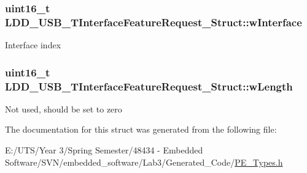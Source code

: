\subsubsection[{w\+Interface}]{\setlength{\rightskip}{0pt plus 5cm}uint16\+\_\+t L\+D\+D\+\_\+\+U\+S\+B\+\_\+\+T\+Interface\+Feature\+Request\+\_\+\+Struct\+::w\+Interface}\label{struct_l_d_d___u_s_b___t_interface_feature_request___struct_afc1da433b4a02f8c6a6ed6ce8b3065da}
Interface index \hypertarget{struct_l_d_d___u_s_b___t_interface_feature_request___struct_a5f54f1e83024342d9d63aad374a117ba}{}
\subsubsection[{w\+Length}]{\setlength{\rightskip}{0pt plus 5cm}uint16\+\_\+t L\+D\+D\+\_\+\+U\+S\+B\+\_\+\+T\+Interface\+Feature\+Request\+\_\+\+Struct\+::w\+Length}\label{struct_l_d_d___u_s_b___t_interface_feature_request___struct_a5f54f1e83024342d9d63aad374a117ba}
Not used, should be set to zero 

The documentation for this struct was generated from the following file\+:\begin{DoxyCompactItemize}
\item 
E\+:/\+U\+T\+S/\+Year 3/\+Spring Semester/48434 -\/ Embedded Software/\+S\+V\+N/embedded\+\_\+software/\+Lab3/\+Generated\+\_\+\+Code/\hyperlink{_p_e___types_8h}{P\+E\+\_\+\+Types.\+h}\end{DoxyCompactItemize}
